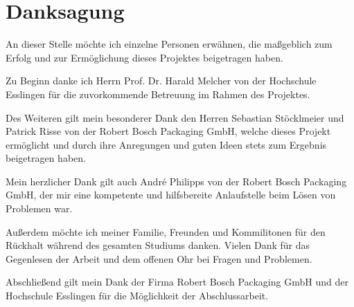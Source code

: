 \chapter*{Danksagung}
\thispagestyle{empty}

An dieser Stelle möchte ich einzelne Personen erwähnen, die maßgeblich zum Erfolg und zur Ermöglichung dieses Projektes
beigetragen haben.

Zu Beginn danke ich Herrn Prof. Dr. Harald Melcher von der Hochschule Esslingen für die zuvorkommende Betreuung im Rahmen
des Projektes.

Des Weiteren gilt mein besonderer Dank den Herren Sebastian Stöcklmeier und Patrick Risse von der Robert Bosch Packaging
GmbH, welche dieses Projekt ermöglicht und durch ihre Anregungen und guten Ideen stets zum Ergebnis beigetragen haben.

Mein herzlicher Dank gilt auch André Philipps von der Robert Bosch Packaging GmbH, der mir eine kompetente und
hilfsbereite Anlaufstelle beim Lösen von Problemen war.

Außerdem möchte ich meiner Familie, Freunden und Kommilitonen für den Rückhalt während des gesamten Studiums danken.
Vielen Dank für das Gegenlesen der Arbeit und dem offenen Ohr bei Fragen und Problemen.

Abschließend gilt mein Dank der Firma Robert Bosch Packaging GmbH und der Hochschule Esslingen für die Möglichkeit der
Abschlussarbeit.